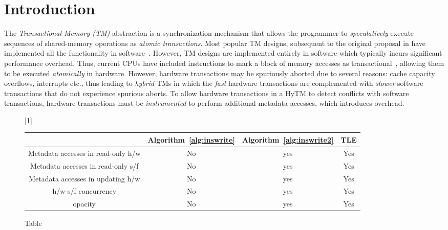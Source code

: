 \section{Introduction}
\label{sec:intro}
%
The \emph{Transactional Memory (TM)} abstraction is a synchronization mechanism 
that allows the programmer to \emph{speculatively} execute sequences of shared-memory
operations as \emph{atomic transactions}.
Most popular TM designs, subsequent to the original proposal in \cite{HM93} 
have implemented all the functionality in software~\cite{norec, ST95,HLM+03, astm, fraser}.
However, TM designs are implemented entirely in software which typically incurs significant performance overhead.
Thus, current CPUs have included instructions to mark a block of memory accesses as transactional~\cite{Rei12, asf, bluegene}, allowing them to be executed \emph{atomically} in hardware.
However, hardware transactions may be spuriously aborted due to several reasons: cache capacity overflows, interrupts etc., thus leading to \emph{hybrid} TMs 
in which the \emph{fast} hardware transactions are complemented with \emph{slower} software transactions that do not experience spurious aborts.
To allow hardware transactions in a HyTM to detect conflicts with software transactions, hardware transactions must be \emph{instrumented} to perform additional metadata accesses, which introduces overhead.

\begin{figure*}[!ht]
      
     \scalebox{1}[1]{
     \begin{tabularx}{\textwidth}{c|c|c|c}
	~~~~~ & Algorithm~\ref{alg:inswrite} & Algorithm~\ref{alg:inswrite2} & TLE\\ \hline
	Metadata accesses in read-only h/w & No & yes & Yes \\ \hline
	Metadata accesses in read-only s/f & No & yes & Yes \\ \hline
	Metadata accesses in updating h/w & No & yes & Yes \\ \hline
	h/w-s/f concurrency & No & yes & Yes \\ \hline
	opacity & No & yes & Yes 
   \end{tabularx}
\caption{Table}\label{fig:main}    
}
\end{figure*}